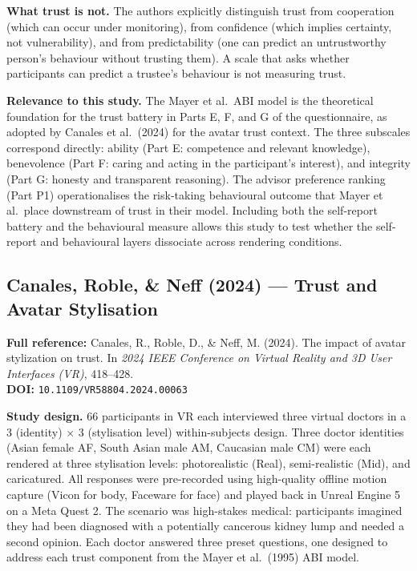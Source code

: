 \documentclass[11pt, a4paper]{article}
\begin{document}
\medskip
\noindent\textbf{What trust is not.} The authors explicitly distinguish trust from cooperation (which can occur under monitoring), from confidence (which implies certainty, not vulnerability), and from predictability (one can predict an untrustworthy person's behaviour without trusting them). A scale that asks whether participants can predict a trustee's behaviour is not measuring trust.

\medskip
\noindent\textbf{Relevance to this study.} The Mayer et al.\ ABI model is the theoretical foundation for the trust battery in Parts E, F, and G of the questionnaire, as adopted by Canales et al.\ (2024) for the avatar trust context. The three subscales correspond directly: ability (Part E: competence and relevant knowledge), benevolence (Part F: caring and acting in the participant's interest), and integrity (Part G: honesty and transparent reasoning). The advisor preference ranking (Part P1) operationalises the risk-taking behavioural outcome that Mayer et al.\ place downstream of trust in their model. Including both the self-report battery and the behavioural measure allows this study to test whether the self-report and behavioural layers dissociate across rendering conditions.

\subsection{Canales, Roble, \& Neff (2024) --- Trust and Avatar Stylisation}

\begin{infobox}
\small
\textbf{Full reference:} Canales, R., Roble, D., \& Neff, M. (2024). The impact of avatar stylization on trust. In \textit{2024 IEEE Conference on Virtual Reality and 3D User Interfaces (VR)}, 418--428.\\[4pt]
\textbf{DOI:} \texttt{10.1109/VR58804.2024.00063}
\end{infobox}

\textbf{Study design.} 66 participants in VR each interviewed three virtual doctors in a 3 (identity) $\times$ 3 (stylisation level) within-subjects design. Three doctor identities (Asian female AF, South Asian male AM, Caucasian male CM) were each rendered at three stylisation levels: photorealistic (Real), semi-realistic (Mid), and caricatured. All responses were pre-recorded using high-quality offline motion capture (Vicon for body, Faceware for face) and played back in Unreal Engine 5 on a Meta Quest 2. The scenario was high-stakes medical: participants imagined they had been diagnosed with a potentially cancerous kidney lump and needed a second opinion. Each doctor answered three preset questions, one designed to address each trust component from the Mayer et al.\ (1995) ABI model.
\end{document}
